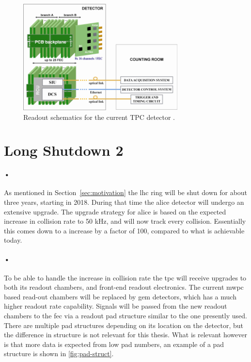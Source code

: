 \documentclass[a4paper, 12pt, openright, twoside]{report}
\begin{document}
\begin{figure}[h!]
  \centering
    \includegraphics[width=0.75\textwidth]{images/altro.png}
     \caption[Readout schematics for the current TPC detector]{Readout schematics for the current TPC detector \cite{tdr-016}.}
    \label{fig:altro}
\end{figure}

\section{Long Shutdown 2}
\paragraph{•}
As mentioned in Section~\ref{sec:motivation} the \gls{lhc} ring will be shut down for about three years, starting in 2018.
During that time the \gls{alice} detector will undergo an extensive upgrade.
The upgrade strategy for \gls{alice} is based on the expected increase in collision rate to 50 kHz, and will now track every collision.
Essentially this comes down to a increase by a factor of 100, compared to what is achievable today.

\paragraph{•} 
To be able to handle the increase in collision rate the \gls{tpc} will receive upgrades to both its readout chambers, and front-end readout electronics.
The current \gls{mwpc} based read-out chambers will be replaced by \gls{gem} detectors, which has a much higher readout rate capability.
Signals will be passed from the new readout chambers to the \gls{fec} via a readout pad structure similar to the one presently used.
There are multiple pad structures depending on its location on the detector, but the difference in structure is not relevant for this thesis.
What is relevant however is that more data is expected from low pad numbers, an example of a pad structure is shown in \ref{fig:pad-struct}.
\end{document}
